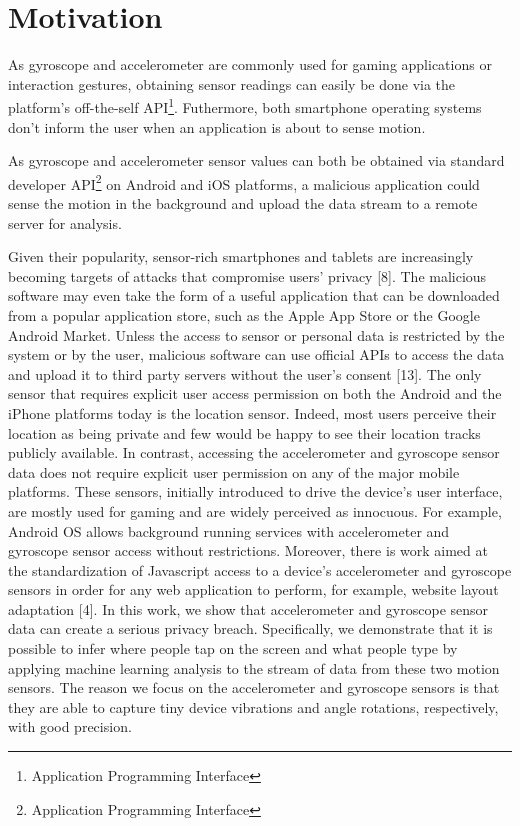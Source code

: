 \section{Motivation}
As gyroscope and accelerometer are commonly used for gaming applications or interaction gestures, obtaining sensor readings can easily be done via the platform's off-the-self API\footnote{Application Programming Interface}. Futhermore, both smartphone operating systems don't inform the user when an application is about to sense motion. 

As gyroscope and accelerometer sensor values can both be obtained via standard developer API\footnote{Application Programming Interface} on Android and iOS platforms, a malicious application could sense the motion in the background and upload the data stream to a remote server for analysis. 

Given their popularity, sensor-rich smartphones and tablets
are increasingly becoming targets of attacks that compromise
users’ privacy [8]. The malicious software may even
take the form of a useful application that can be downloaded
from a popular application store, such as the Apple App
Store or the Google Android Market. Unless the access to
sensor or personal data is restricted by the system or by the
user, malicious software can use official APIs to access the
data and upload it to third party servers without the user’s
consent [13].
The only sensor that requires explicit user access permission
on both the Android and the iPhone platforms today
is the location sensor. Indeed, most users perceive their
location as being private and few would be happy to see
their location tracks publicly available. In contrast, accessing
the accelerometer and gyroscope sensor data does not
require explicit user permission on any of the major mobile
platforms. These sensors, initially introduced to drive
the device’s user interface, are mostly used for gaming and
are widely perceived as innocuous. For example, Android
OS allows background running services with accelerometer
and gyroscope sensor access without restrictions. Moreover,
there is work aimed at the standardization of Javascript access
to a device’s accelerometer and gyroscope sensors in
order for any web application to perform, for example, website
layout adaptation [4]. In this work, we show that accelerometer
and gyroscope sensor data can create a serious
privacy breach. Specifically, we demonstrate that it is possible
to infer where people tap on the screen and what people
type by applying machine learning analysis to the stream of
data from these two motion sensors. The reason we focus
on the accelerometer and gyroscope sensors is that they are
able to capture tiny device vibrations and angle rotations,
respectively, with good precision.


